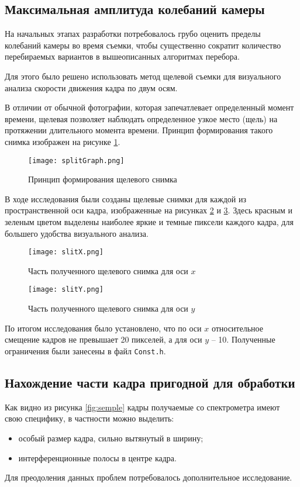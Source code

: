 \subsection{Максимальная амплитуда колебаний камеры}
На начальных этапах разработки потребовалось грубо оценить пределы колебаний камеры во время съемки, чтобы существенно сократит количество перебираемых вариантов в вышеописанных алгоритмах перебора.

Для этого было решено использовать метод щелевой съемки для визуального анализа скорости движения кадра по двум осям.

В отличии от обычной фотографии, которая запечатлевает определенный момент времени, щелевая позволяет наблюдать определенное узкое место (щель) на протяжении длительного момента времени. Принцип  формирования такого снимка изображен на рисунке \ref{fig:splitGraph}.
\begin{figure}[h]
    \centering   
    \texttt{[image: splitGraph.png]} 
    \caption{Принцип  формирования щелевого снимка}
    \label{fig:splitGraph}
\end{figure} 

В ходе исследования были созданы щелевые снимки для каждой из пространственной оси кадра, изображенные на рисунках \ref{fig:slitX} и \ref{fig:slitY}. Здесь красным и зеленым цветом выделены наиболее яркие и темные пиксели каждого кадра, для большего удобства визуального анализа.
\begin{figure}
    \centering   
    \texttt{[image: slitX.png]} 
    \caption{Часть полученного щелевого снимка для оси $x$}
    \label{fig:slitX}
\end{figure} 
\begin{figure}
    \centering   
    \texttt{[image: slitY.png]} 
    \caption{Часть полученного щелевого снимка для оси $y$}
    \label{fig:slitY}
\end{figure} 

По итогом исследования было установлено, что по оси $x$ относительное смещение кадров не превышает 20 пикселей, а для оси $y$ -- 10. Полученные ограничения были занесены в файл \texttt{Const.h}. 
\subsection{Нахождение части кадра пригодной для обработки}
Как видно из рисунка \ref{fig:semple} кадры получаемые со спектрометра имеют свою специфику, в частности можно выделить:
\begin{itemize}
	\item особый размер кадра, сильно вытянутый в ширину;
	\item интерференционные полосы в центре кадра. 
\end{itemize}
Для преодоления данных проблем потребовалось дополнительное исследование.

